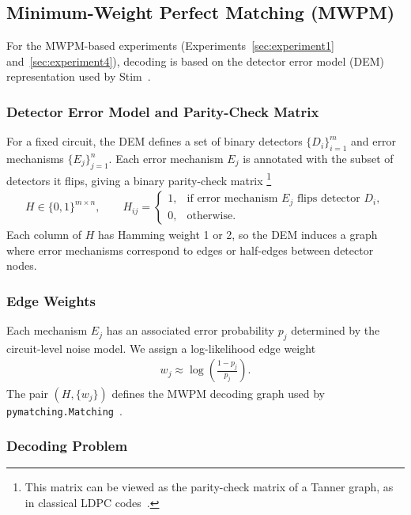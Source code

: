 \documentclass[11pt, notitlepage, letterpaper]{article}
\begin{document}
\subsection{Minimum-Weight Perfect Matching (MWPM)}
\label{appendix:mwpm-details}

For the MWPM-based experiments (Experiments~\ref{sec:experiment1} and~\ref{sec:experiment4}), decoding is based on the detector error model (DEM) representation used by Stim~\cite{gidney_stim_2021}.

\subsubsection*{Detector Error Model and Parity-Check Matrix}

For a fixed circuit, the DEM defines a set of binary detectors $\{D_i\}_{i=1}^m$ and error mechanisms $\{E_j\}_{j=1}^n$. Each error mechanism $E_j$ is annotated with the subset of detectors it flips, giving a binary parity-check matrix%
\footnote{This matrix can be viewed as the parity-check matrix of a Tanner graph, as in classical LDPC codes~\cite{noauthor_tanner_2025}.}
\begin{align}
    H \in \{0,1\}^{m\times n}, \qquad
    H_{ij} =
    \begin{cases}
        1, & \text{if error mechanism } E_j \text{ flips detector } D_i, \\[4pt]
        0, & \text{otherwise}.
    \end{cases}
\end{align}
Each column of $H$ has Hamming weight 1 or 2, so the DEM induces a graph where error mechanisms correspond to edges or half-edges between detector nodes.

\subsubsection*{Edge Weights}

Each mechanism $E_j$ has an associated error probability $p_j$ determined by the circuit-level noise model. We assign a log-likelihood edge weight~\cite{higgott_sparse_2025}
\begin{align}
    w_j \approx \log\!\left(\frac{1 - p_j}{p_j}\right).
\end{align}
The pair $(H, \{w_j\})$ defines the MWPM decoding graph used by \texttt{pymatching.Matching}~\cite{oscarhiggott_oscarhiggottpymatching_2025}.

\subsubsection*{Decoding Problem}
\end{document}
